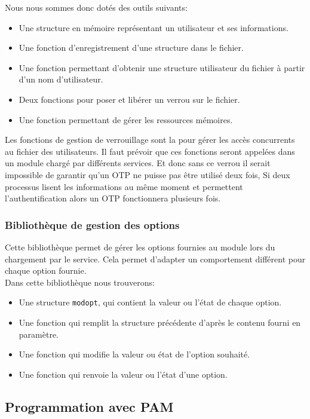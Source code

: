 Nous nous sommes donc dotés des outils suivants:
\begin{itemize}
  \item Une structure en mémoire représentant un utilisateur et ses
  informations.
  \item Une fonction d'enregistrement d'une structure dans le fichier.
  \item Une fonction permettant d'obtenir une structure utilisateur du fichier
  à partir d'un nom d'utilisateur.
  \item Deux fonctions pour poser et libérer un verrou sur le fichier.
  \item Une fonction permettant de gérer les ressources mémoires.\\
\end{itemize}

Les fonctions de gestion de verrouillage sont la pour gérer les accès concurrents
au fichier des utilisateurs. Il faut prévoir que ces fonctions seront appelées
dans un module chargé par différents services. Et donc sans ce verrou il serait
impossible de garantir qu'un OTP ne puisse pas être utilisé deux fois, Si deux
processus lisent les informations au même moment et permettent l'authentification
alors un OTP fonctionnera plusieurs fois.

\subsubsection{Bibliothèque de gestion des options}
Cette bibliothèque permet de gérer les options fournies au module lors du chargement
par le service. Cela permet d'adapter un comportement différent pour chaque option fournie.\\
Dans cette bibliothèque nous trouverons:
\begin{itemize}
  \item Une structure \verb?modopt?, qui contient la valeur ou l'état de chaque option.
  \item Une fonction qui remplit la structure précédente d'après le contenu fourni en paramètre.
  \item Une fonction qui modifie la valeur ou état de l'option souhaité.
  \item Une fonction qui renvoie la valeur ou l'état d'une option.
\end{itemize}

\subsection{Programmation avec PAM}
